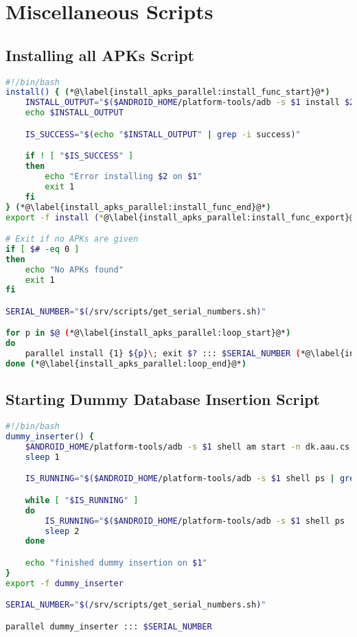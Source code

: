 \chapter{Miscellaneous Scripts}\label{app:miscscripts}

\section{Installing all APKs Script}\label{app:install_apks}
\begin{lstlisting}[language=bash,caption=Script that install APKs on all connected devices in parallel,label=lst:install_apks_parallel]
#!/bin/bash
install() { (*@\label{install_apks_parallel:install_func_start}@*)
    INSTALL_OUTPUT="$($ANDROID_HOME/platform-tools/adb -s $1 install $2)"
    echo $INSTALL_OUTPUT

    IS_SUCCESS="$(echo "$INSTALL_OUTPUT" | grep -i success)"

    if ! [ "$IS_SUCCESS" ]
    then
        echo "Error installing $2 on $1"
        exit 1
    fi
} (*@\label{install_apks_parallel:install_func_end}@*)
export -f install (*@\label{install_apks_parallel:install_func_export}@*)

# Exit if no APKs are given
if [ $# -eq 0 ]
then
    echo "No APKs found"
    exit 1
fi

SERIAL_NUMBER="$(/srv/scripts/get_serial_numbers.sh)"

for p in $@ (*@\label{install_apks_parallel:loop_start}@*)
do
    parallel install {1} ${p}\; exit $? ::: $SERIAL_NUMBER (*@\label{install_apks_parallel:parallel_loop}@*)
done (*@\label{install_apks_parallel:loop_end}@*)
\end{lstlisting}

\section{Starting Dummy Database Insertion Script}\label{app:start_wait_db_inserter_parallel}
\begin{lstlisting}[language=bash,caption=Script that starts and waits for the dummy database insertion app in parallel on all connected devices,label=lst:start_wait_db_inserter_parallel]
#!/bin/bash
dummy_inserter() {
    $ANDROID_HOME/platform-tools/adb -s $1 shell am start -n dk.aau.cs.giraf.dummydbinserter/dk.aau.cs.giraf.dummydbinserter.MainActivity
    sleep 1

    IS_RUNNING="$($ANDROID_HOME/platform-tools/adb -s $1 shell ps | grep dk.aau.cs.giraf.dummydbinserter)"

    while [ "$IS_RUNNING" ]
    do
        IS_RUNNING="$($ANDROID_HOME/platform-tools/adb -s $1 shell ps | grep dk.aau.cs.giraf.dummydbinserter)"
        sleep 2
    done

    echo "finished dummy insertion on $1"
}
export -f dummy_inserter

SERIAL_NUMBER="$(/srv/scripts/get_serial_numbers.sh)"

parallel dummy_inserter ::: $SERIAL_NUMBER

\end{lstlisting}